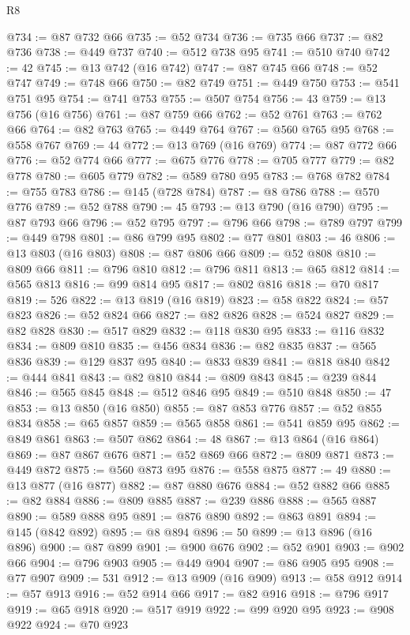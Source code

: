 \begin{lexlean}{R8}
\begin{coremodule}
@734 := @87 @732 @66
@735 := @52 @734
@736 := @735 @66
@737 := @82 @736
@738 := @449 @737
@740 := @512 @738 @95
@741 := @510 @740
@742 := 42
@745 := @13 @742 (@16 @742)
@747 := @87 @745 @66
@748 := @52 @747
@749 := @748 @66
@750 := @82 @749
@751 := @449 @750
@753 := @541 @751 @95
@754 := @741 @753
@755 := @507 @754
@756 := 43
@759 := @13 @756 (@16 @756)
@761 := @87 @759 @66
@762 := @52 @761
@763 := @762 @66
@764 := @82 @763
@765 := @449 @764
@767 := @560 @765 @95
@768 := @558 @767
@769 := 44
@772 := @13 @769 (@16 @769)
@774 := @87 @772 @66
@776 := @52 @774 @66
@777 := @675 @776
@778 := @705 @777
@779 := @82 @778
@780 := @605 @779
@782 := @589 @780 @95
@783 := @768 @782
@784 := @755 @783
@786 := @145 (@728 @784)
@787 := @8 @786
@788 := @570 @776
@789 := @52 @788
@790 := 45
@793 := @13 @790 (@16 @790)
@795 := @87 @793 @66
@796 := @52 @795
@797 := @796 @66
@798 := @789 @797
@799 := @449 @798
@801 := @86 @799 @95
@802 := @77 @801
@803 := 46
@806 := @13 @803 (@16 @803)
@808 := @87 @806 @66
@809 := @52 @808
@810 := @809 @66
@811 := @796 @810
@812 := @796 @811
@813 := @65 @812
@814 := @565 @813
@816 := @99 @814 @95
@817 := @802 @816
@818 := @70 @817
@819 := 526
@822 := @13 @819 (@16 @819)
@823 := @58 @822
@824 := @57 @823
@826 := @52 @824 @66
@827 := @82 @826
@828 := @524 @827
@829 := @82 @828
@830 := @517 @829
@832 := @118 @830 @95
@833 := @116 @832
@834 := @809 @810
@835 := @456 @834
@836 := @82 @835
@837 := @565 @836
@839 := @129 @837 @95
@840 := @833 @839
@841 := @818 @840
@842 := @444 @841
@843 := @82 @810
@844 := @809 @843
@845 := @239 @844
@846 := @565 @845
@848 := @512 @846 @95
@849 := @510 @848
@850 := 47
@853 := @13 @850 (@16 @850)
@855 := @87 @853 @776
@857 := @52 @855 @834
@858 := @65 @857
@859 := @565 @858
@861 := @541 @859 @95
@862 := @849 @861
@863 := @507 @862
@864 := 48
@867 := @13 @864 (@16 @864)
@869 := @87 @867 @676
@871 := @52 @869 @66
@872 := @809 @871
@873 := @449 @872
@875 := @560 @873 @95
@876 := @558 @875
@877 := 49
@880 := @13 @877 (@16 @877)
@882 := @87 @880 @676
@884 := @52 @882 @66
@885 := @82 @884
@886 := @809 @885
@887 := @239 @886
@888 := @565 @887
@890 := @589 @888 @95
@891 := @876 @890
@892 := @863 @891
@894 := @145 (@842 @892)
@895 := @8 @894
@896 := 50
@899 := @13 @896 (@16 @896)
@900 := @87 @899
@901 := @900 @676
@902 := @52 @901
@903 := @902 @66
@904 := @796 @903
@905 := @449 @904
@907 := @86 @905 @95
@908 := @77 @907
@909 := 531
@912 := @13 @909 (@16 @909)
@913 := @58 @912
@914 := @57 @913
@916 := @52 @914 @66
@917 := @82 @916
@918 := @796 @917
@919 := @65 @918
@920 := @517 @919
@922 := @99 @920 @95
@923 := @908 @922
@924 := @70 @923

\end{coremodule}
\end{lexlean}
